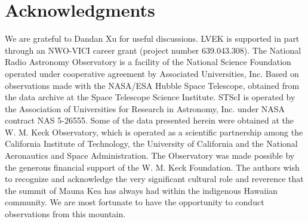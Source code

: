 \documentclass[a4paper,fleqn,usenatbib,useAMS]{mnras}
\begin{document}
\section*{Acknowledgments}
We are grateful to Dandan Xu for useful discussions. LVEK is supported in part through an NWO-VICI career grant (project number 639.043.308). The National Radio Astronomy Observatory is a facility of the National Science Foundation operated under cooperative agreement by Associated Universities, Inc. Based on observations made with the NASA/ESA Hubble Space Telescope, obtained from the data archive at the Space Telescope Science Institute. STScI is operated by the Association of Universities for Research in Astronomy, Inc. under NASA contract NAS 5-26555. Some of the data presented herein were obtained at the W. M. Keck Observatory, which is operated as a scientific partnership among the California Institute of Technology, the University of California and the National Aeronautics and Space Administration. The Observatory was made possible by the generous financial support of the W. M. Keck Foundation. The authors wish to recognize and acknowledge the very significant cultural role and reverence that the summit of Mauna Kea has always had within the indigenous Hawaiian community.  We are most fortunate to have the opportunity to conduct observations from this mountain.






\bsp
\label{lastpage}
\end{document}
